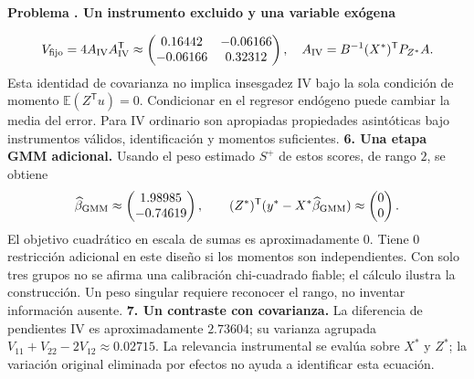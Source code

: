 \documentclass[11pt,a4paper]{article}
\newcommand{\E}{\mathbb E}
\newcommand{\T}{^{\mathsf T}}
\theoremstyle{definition}
\newcounter{problema}
\newenvironment{resuelto}[1]{\refstepcounter{problema}\par\medskip\Needspace{6\baselineskip}\textbf{Problema \theproblema. #1}\par}{\par\medskip}
\begin{document}
\begin{resuelto}{Un instrumento excluido y una variable exógena}
\[
V_{\rm fijo}=4A_{\rm IV}A_{\rm IV}\T\approx\begin{pmatrix}
0.16442&-0.06166\\-0.06166&0.32312
\end{pmatrix},\quad A_{\rm IV}=B^{-1}(X^*)\T P_{Z^*}A.
\]
Esta identidad de covarianza no implica insesgadez IV bajo la sola condición de momento $\E(Z\T u)=0$. Condicionar en el regresor endógeno puede cambiar la media del error. Para IV ordinario son apropiadas propiedades asintóticas bajo instrumentos válidos, identificación y momentos suficientes.
\textbf{6. Una etapa GMM adicional.} Usando el peso estimado $S^+$ de estos scores, de rango $2$, se obtiene
\[
\widehat\beta_{\rm GMM}\approx\begin{pmatrix}
1.98985\\-0.74619
\end{pmatrix},\qquad
(Z^*)\T(y^*-X^*\widehat\beta_{\rm GMM})\approx\begin{pmatrix}
0\\0
\end{pmatrix}.
\]
El objetivo cuadrático en escala de sumas es aproximadamente $0$. Tiene 0 restricción adicional en este diseño si los momentos son independientes. Con solo tres grupos no se afirma una calibración chi-cuadrado fiable; el cálculo ilustra la construcción. Un peso singular requiere reconocer el rango, no inventar información ausente.
\textbf{7. Un contraste con covarianza.} La diferencia de pendientes IV es aproximadamente $2.73604$; su varianza agrupada $V_{11}+V_{22}-2V_{12}\approx0.02715$. La relevancia instrumental se evalúa sobre $X^*$ y $Z^*$; la variación original eliminada por efectos no ayuda a identificar esta ecuación.
\end{resuelto}
\end{document}
